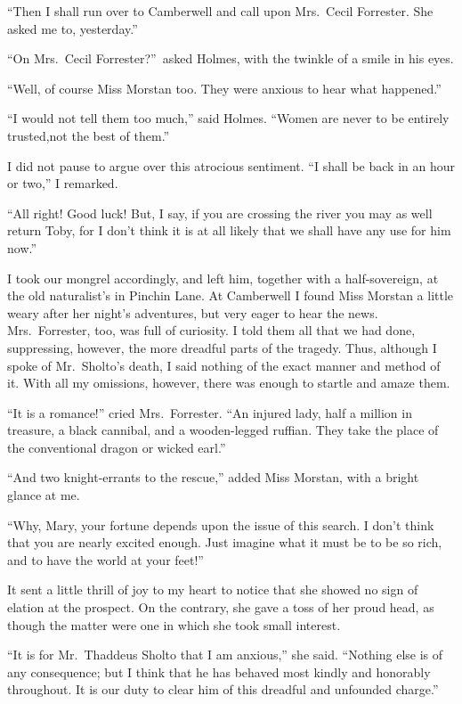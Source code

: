 \documentclass[12pt,english,oneside]{book}
\begin{document}
{}``Then I shall run over to Camberwell and call upon Mrs.\ Cecil
Forrester. She asked me to, yesterday.''

{}``On Mrs.\ Cecil Forrester?''\ asked Holmes, with the twinkle
of a smile in his eyes.

{}``Well, of course Miss Morstan too. They were anxious to hear what
happened.''

{}``I would not tell them too much,'' said Holmes. {}``Women are
never to be entirely trusted,\mdsh{---}not the best of them.''

I did not pause to argue over this atrocious sentiment. {}``I shall
be back in an hour or two,'' I remarked.

{}``All right! Good luck! But, I say, if you are crossing the river
you may as well return Toby, for I don't think it is at all likely
that we shall have any use for him now.''

I took our mongrel accordingly, and left him, together with a half-sovereign,
at the old naturalist's in Pinchin Lane. At Camberwell I found Miss
Morstan a little weary after her night's adventures, but very eager
to hear the news. Mrs.\ Forrester, too, was full of curiosity. I
told them all that we had done, suppressing, however, the more dreadful
parts of the tragedy. Thus, although I spoke of Mr.\ Sholto's death,
I said nothing of the exact manner and method of it. With all my omissions,
however, there was enough to startle and amaze them.

{}``It is a romance!'' cried Mrs.\ Forrester. {}``An injured lady,
half a million in treasure, a black cannibal, and a wooden-legged
ruffian. They take the place of the conventional dragon or wicked
earl.''

{}``And two knight-errants to the rescue,'' added Miss Morstan,
with a bright glance at me.

{}``Why, Mary, your fortune depends upon the issue of this search.
I don't think that you are nearly excited enough. Just imagine what
it must be to be so rich, and to have the world at your feet!''

It sent a little thrill of joy to my heart to notice that she showed
no sign of elation at the prospect. On the contrary, she gave a toss
of her proud head, as though the matter were one in which she took
small interest.

{}``It is for Mr.\ Thaddeus Sholto that I am anxious,'' she said.
{}``Nothing else is of any consequence; but I think that he has behaved
most kindly and honorably throughout. It is our duty to clear him
of this dreadful and unfounded charge.''
\end{document}
